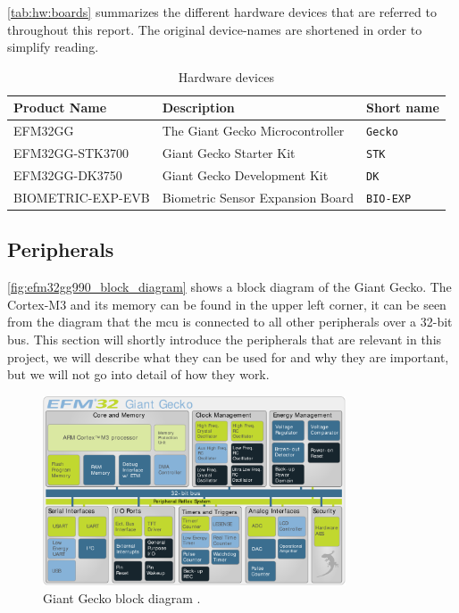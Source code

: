 \autoref{tab:hw:boards} summarizes the different hardware devices that are referred to throughout this report.
The original device-names are shortened in order to simplify reading.

\begin{table}[H]
  \begin{tabular}{l|l|l}
    \textbf{Product Name} & \textbf{Description} & \textbf{Short name} \\
    \hline
    EFM32GG & The Giant Gecko Microcontroller & \texttt{Gecko} \\
    EFM32GG-STK3700 & Giant Gecko Starter Kit & \texttt{STK} \\
    EFM32GG-DK3750 & Giant Gecko Development Kit & \texttt{DK} \\
    BIOMETRIC-EXP-EVB & Biometric Sensor Expansion Board & \texttt{BIO-EXP} \\
    \hline
  \end{tabular}
  \caption{Hardware devices}
  \label{tab:hw:boards}
\end{table}

\subsection{Peripherals}
\label{sub:peripherals}

\autoref{fig:efm32gg990_block_diagram} shows a block diagram of the Giant Gecko.
The Cortex-M3 and its memory can be found in the upper left corner, it can be seen from the diagram that the \gls{mcu} is connected to all other peripherals over a 32-bit bus.
This section will shortly introduce the peripherals that are relevant in this project, we will describe what they can be used for and why they are important, but we will not go into detail of how they work.

\begin{figure}[H]
\begin{center}
\includegraphics[width=0.8\textwidth]{figures/gg_block_diagram}
\end{center}
\caption{Giant Gecko block diagram \cite{Labs}.}
\label{fig:efm32gg990_block_diagram}
\end{figure}

